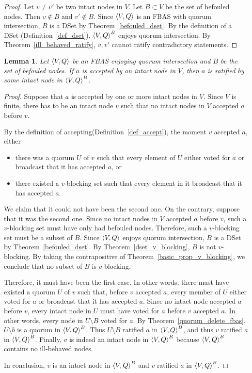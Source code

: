 \documentclass[12pt, psamsfonts]{amsart}
\newtheorem{lem}[thm]{Lemma}
\theoremstyle{definition}
\theoremstyle{remark}
\numberwithin{equation}{subsection}
\begin{document}
\begin{proof}
    Let $v \ne v'$ be two intact nodes in $V$.
    Let $B \subset V$ be the set of befouled nodes.
    Then $v \notin B$ and $v' \notin B$.
    Since $\ev{V, Q}$ is an FBAS with quorum intersection, $B$ is a DSet by Theorem~\ref{befouled_dset}.
    By the definition of a DSet (Definition~\ref{def_dset}), $\ev{V, Q}^B$ enjoys quorum intersection.
    By Theorem~\ref{ill_behaved_ratify}, $v, v'$ cannot ratify contradictory statements.
\end{proof}

\begin{lem}\label{lem_intact_ratify}
    Let $\ev{V, Q}$ be an FBAS enjoying quorum intersection and $B$ be the set of befouled nodes.
    If $a$ is accepted by an intact node in $V$, then $a$ is ratified by some intact node in $\ev{V, Q}^B$.
\end{lem}

\begin{proof}
    Suppose that $a$ is accepted by one or more intact nodes in $V$.
    Since $V$ is finite, there has to be an intact node $v$ such that no intact nodes in $V$ accepted $a$ before $v$.

    By the definition of accepting(Definition~\ref{def_accept}), the moment $v$ accepted $a$, either
    \begin{itemize}
        \item
            there was a quorum $U$ of $v$ such that every element of $U$ either voted for $a$ or broadcast that it has accepted $a$, or
        \item
            there existed a $v$-blocking set such that every element in it broadcast that it has accepted $a$.
    \end{itemize}
    We claim that it could not have been the second one.
    On the contrary, suppose that it was the second one.
    Since no intact nodes in $V$ accepted $a$ before $v$, such a $v$-blocking set must have only had befouled nodes.
    Therefore, such a $v$-blocking set must be a subset of $B$.
    Since $\ev{V, Q}$ enjoys quorum intersection, $B$ is a DSet by Theorem~\ref{befouled_dset}.
    By Theorem~\ref{dset_v_blocking}, $B$ is not $v$-blocking.
    By taking the contrapositive of Theorem~\ref{basic_prop_v_blocking}, we conclude that no subset of $B$ is $v$-blocking.

    Therefore, it must have been the first case.
    In other words, there must have existed a quorum $U$ of $v$ such that, before $v$ accepted $a$, every member of $U$ either voted for $a$ or broadcast that it has accepted $a$.
    Since no intact node accepted $a$ before $v$, every intact node in $U$ must have voted for $a$ before $v$ accepted $a$.
    In other words, every node in $U \setminus B$ voted for $a$.
    By Theorem~\ref{quorum_delete_fbas}, $U \setminus b$ is a quorum in $\ev{V, Q}^B$.
    Thus  $U \setminus B$ ratified $a$ in ${\ev{V, Q}}^B$, and thus $v$ ratified $a$ in $\ev{V, Q}^B$.
    Finally, $v$ is indeed an intact node in ${\ev{V, Q}}^B$ because ${\ev{V, Q}}^B$ contains no ill-behaved nodes.

    In conclusion, $v$ is an intact node in $\ev{V, Q}^B$ and $v$ ratified $a$ in $\ev{V, Q}^B$.
\end{proof}
\end{document}
